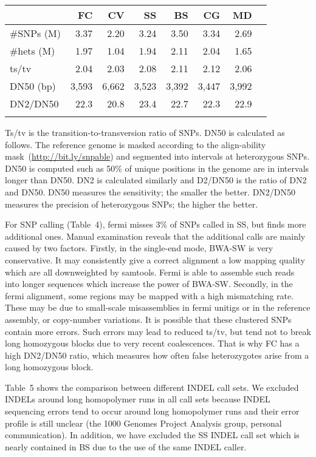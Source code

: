 \documentclass{bioinfo}
\begin{document}
\begin{table}[b]
{\begin{tabular}{p{2.3cm}rrrrrrr}
\toprule
& FC & CV & SS & BS & CG & MD \\
\midrule
\#SNPs (M) & 3.37 & 2.20 & 3.24 & 3.50 & 3.34 & 2.69\\
\#hets (M) & 1.97 & 1.04 & 1.94 & 2.11 & 2.04 & 1.65\\
ts/tv      & 2.04 & 2.03 & 2.08 & 2.11 & 2.12 & 2.06\\
DN50 (bp)  & 3,593& 6,662& 3,523& 3,392& 3,447&3,992\\
DN2/DN50   & 22.3 & 20.8 & 23.4 & 22.7 & 22.3 & 22.9\\
\botrule
\end{tabular}}{Ts/tv is the transition-to-transversion ratio of SNPs. DN50 is
calculated as follows. The reference genome is masked according to the
align-ability mask~(\href{http://bit.ly/snpable}{http://bit.ly/snpable}) and segmented into intervals at
heterozygous SNPs. DN50 is computed such as 50\% of unique positions in the
genome are in intervals longer than DN50. DN2 is calculated similarly and
D2/DN50 is the ratio of DN2 and DN50. DN50 measures the sensitivity; the
smaller the better.  DN2/DN50 measures the precision of heterozygous SNPs; the
higher the better.}

\end{table}

For SNP calling (Table~4), fermi misses 3\% of SNPs called in SS,
but finds more additional ones. Manual examination reveals that
the additional calls are mainly caused by two factors. Firstly, in the
single-end mode, BWA-SW is very conservative. It may consistently give a
correct alignment a low mapping quality which are all downweighted by samtools.
Fermi is able to assemble such reads into
longer sequences which increase the power of BWA-SW. Secondly, in the fermi
alignment, some regions may be mapped with a high mismatching rate.  These may
be due to small-scale misassemblies in fermi unitigs or in the reference
assembly, or copy-number variations. It is possible that these clustered
SNPs contain more errors. Such errors may lead to reduced ts/tv, but tend
not to break long homozygous blocks due to very recent coalescences. That
is why FC has a high DN2/DN50 ratio, which measures how often false heterozygotes
arise from a long homozygous block.

Table~5 shows the comparison between different INDEL call sets. We excluded
INDELs around long homopolymer runs in all call sets because INDEL sequencing
errors tend to occur around long homopolymer runs and their error profile is still unclear
(the 1000 Genomes Project Analysis group, personal communication). In addition,
we have excluded the SS INDEL call set which is nearly contained in BS due to
the use of the same INDEL caller.
\end{document}
